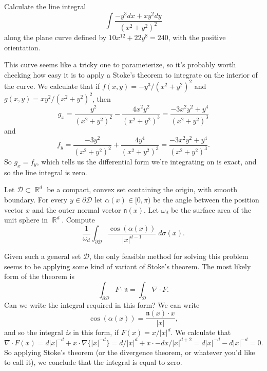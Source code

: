 \documentclass[answers]{exam}
\DeclareMathOperator{\RR}{\mathbb{R}}
\begin{document}
\begin{questions}
\question Calculate the line integral
%
\[ \int \frac{-y^3 dx + xy^2 dy}{(x^2 + y^2)^2} \]
%
along the plane curve defined by $10x^{12} + 22 y^8 = 240$, with the positive orientation.
\begin{solution}
	This curve seems like a tricky one to parameterize, so it's probably worth checking how easy it is to apply a Stoke's theorem to integrate on the interior of the curve. We calculate that if $f(x,y) = -y^3 / (x^2 + y^2)^2$ and $g(x,y) = xy^2 / (x^2 + y^2)^2$, then
	\[ g_x = \frac{y^2}{(x^2 + y^2)^2} - \frac{4x^2y^2}{(x^2 + y^2)^3} = \frac{-3x^2y^2 + y^4}{(x^2 + y^2)^3} \]
	and
	\[ f_y = \frac{-3y^2}{(x^2 + y^2)^2} + \frac{4y^4}{(x^2 + y^2)^3} = \frac{-3x^2y^2 + y^4}{(x^2 + y^2)^3}. \]
	So $g_x = f_y$, which tells us the differential form we're integrating on is exact, and so the line integral is zero.
\end{solution}

\question Let $\mathcal{D} \subset \RR^d$ be a compact, convex set containing the origin, with smooth boundary. For every $y \in \partial \mathcal{D}$ let $\alpha(x) \in [0,\pi)$ be the angle between the position vector $x$ and the outer normal vector $\mathfrak{n}(x)$. Let $\omega_d$ be the surface area of the unit sphere in $\RR^d$. Compute
%
\[ \frac{1}{\omega_d} \int_{\partial \mathcal{D}} \frac{\cos(\alpha(x))}{|x|^{d-1}}\; d\sigma(x). \]
\begin{solution}
	Given such a general set $\mathcal{D}$, the only feasible method for solving this problem seems to be applying some kind of variant of Stoke's theorem. The most likely form of the theorem is
	\[ \int_{\partial \mathcal{D}} F \cdot \mathfrak{n} = \int_{\mathcal{D}} \nabla \cdot F. \]
	Can we write the integral required in this form? We can write
	\[ \cos(\alpha(x)) = \frac{\mathfrak{n}(x) \cdot x}{|x|}, \]
	and so the integral \emph{is} in this form, if $F(x) = x / |x|^d$. We calculate that
	\[ \nabla \cdot F(x) = d |x|^{-d} + x \cdot \nabla \{ |x|^{-d} \} = d/|x|^d + x \cdot -d x/|x|^{d+2} = d |x|^{-d} - d |x|^{-d} = 0. \]
	So applying Stoke's theorem (or the divergence theorem, or whatever you'd like to call it), we conclude that the integral is equal to zero.
\end{solution}


\end{questions}
\end{document}
